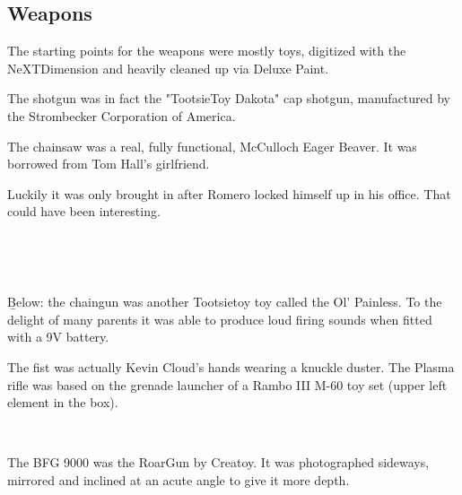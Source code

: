 \subsection{Weapons}
The starting points for the weapons were mostly toys, digitized with the NeXTDimension and heavily cleaned up via Deluxe Paint.\\
\par
 The shotgun was in fact the "TootsieToy Dakota" cap shotgun, manufactured by the Strombecker Corporation of America.\\
\par
{}
\par
The chainsaw was a real, fully functional, McCulloch Eager Beaver. It was borrowed from Tom Hall's girlfriend.\\
\par
{}
\par
Luckily it was only brought in after Romero locked himself up in his office. That could have been interesting.\\
\par
{}\\
\par





\\
\par

\b{Below:} the chaingun was another Tootsietoy toy called the Ol' Painless. To the delight of many parents it was able to produce loud firing sounds when fitted with a 9V battery.

\par
{}

\vspace{-5mm}
The fist was actually Kevin Cloud's hands wearing a knuckle duster. The Plasma rifle was based on the grenade launcher of a Rambo III M-60 toy set (upper left element in the box).
\par
{}\\
\par
The BFG 9000 was the RoarGun by Creatoy. It was photographed sideways, mirrored and inclined at an acute angle to give it more depth.\\
\par
{}
\pagebreak


